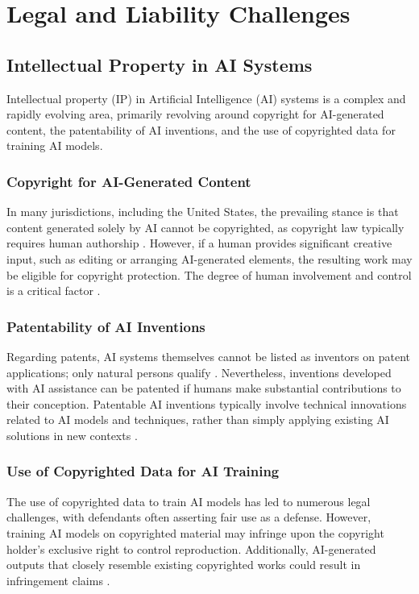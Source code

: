 \chapter{Legal and Liability Challenges}
\label{chap:legal_and_liability_challenges}

\section{Intellectual Property in AI Systems}
\label{sec:ip_in_ai}
Intellectual property (IP) in Artificial Intelligence (AI) systems is a complex and rapidly evolving area, primarily revolving around copyright for AI-generated content, the patentability of AI inventions, and the use of copyrighted data for training AI models.

\subsection{Copyright for AI-Generated Content}
In many jurisdictions, including the United States, the prevailing stance is that content generated solely by AI cannot be copyrighted, as copyright law typically requires human authorship \parencite{USCopyrightOffice2023}. However, if a human provides significant creative input, such as editing or arranging AI-generated elements, the resulting work may be eligible for copyright protection. The degree of human involvement and control is a critical factor \parencite{MayerBrown2023}.

\subsection{Patentability of AI Inventions}
Regarding patents, AI systems themselves cannot be listed as inventors on patent applications; only natural persons qualify \parencite{Thompson2025}. Nevertheless, inventions developed with AI assistance can be patented if humans make substantial contributions to their conception. Patentable AI inventions typically involve technical innovations related to AI models and techniques, rather than simply applying existing AI solutions in new contexts \parencite{CooleyGO2023}.

\subsection{Use of Copyrighted Data for AI Training}
The use of copyrighted data to train AI models has led to numerous legal challenges, with defendants often asserting fair use as a defense. However, training AI models on copyrighted material may infringe upon the copyright holder's exclusive right to control reproduction. Additionally, AI-generated outputs that closely resemble existing copyrighted works could result in infringement claims \parencite{USC2023}.

